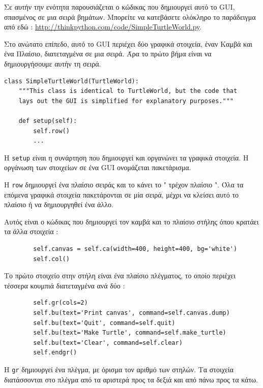 \documentclass[10pt]{book}
\begin{document}
 Σε αυτήν την ενότητα παρουσιάζεται ο κώδικας που δημιουργεί αυτό το  GUI,  σπασμένος σε μια σειρά βημάτων.  Μπορείτε να κατεβάσετε ολόκληρο το παράδειγμα από εδώ : 
\url{http://thinkpython.com/code/SimpleTurtleWorld.py}.

Στο ανώτατο επίπεδο, αυτό το  GUI  περιέχει δύο γραφικά στοιχεία, έναν Καμβά και ένα Πλαίσιο, διατεταγμένα σε μια σειρά.  Άρα το πρώτο βήμα είναι να δημιουργήσουμε αυτήν τη 
σειρά.   

\begin{verbatim}
class SimpleTurtleWorld(TurtleWorld):
    """This class is identical to TurtleWorld, but the code that
    lays out the GUI is simplified for explanatory purposes."""

    def setup(self):
        self.row()
        ...
\end{verbatim}
%
 Η  {\tt setup}  είναι η συνάρτηση που δημιουργεί και οργανώνει τα γραφικά στοιχεία. 
Η οργάνωση των στοιχείων σε ένα  GUI  ονομάζεται πακετάρισμα.

Η  {\tt row}  δημιουργεί ένα πλαίσιο σειράς και το κάνει το  " τρέχον πλαίσιο ".   Όλα τα επόμενα γραφικά στοιχεία πακετάρονται σε μία σειρά, μέχρι να κλείσει αυτό το πλαίσιο ή να δημιουργηθεί ένα άλλο.

Αυτός είναι ο κώδικας που δημιουργεί τον καμβά και το πλαίσιο στήλης όπου κρατάει τα 
άλλα στοιχεία :

\begin{verbatim}
        self.canvas = self.ca(width=400, height=400, bg='white')
        self.col()
\end{verbatim}
%
 Το πρώτο στοιχείο στην στήλη είναι ένα πλαίσιο πλέγματος, το οποίο περιέχει τέσσερα 
κουμπιά διατεταγμένα ανά δύο :

\begin{verbatim}
        self.gr(cols=2)
        self.bu(text='Print canvas', command=self.canvas.dump)
        self.bu(text='Quit', command=self.quit)
        self.bu(text='Make Turtle', command=self.make_turtle)
        self.bu(text='Clear', command=self.clear)
        self.endgr()
\end{verbatim}
%
 Η  {\tt gr}  δημιουργεί ένα πλέγμα, με όρισμα τον αριθμό των στηλών.  
Τα στοιχεία διατάσσονται στο πλέγμα από τα αριστερά προς τα δεξιά και από πάνω προς τα 
κάτω.
\end{document}
